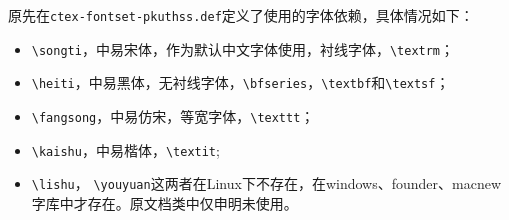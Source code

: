 原先\pkuthss{}在\verb|ctex-fontset-pkuthss.def|定义了使用的字体依赖，具体情况如下：
\begin{itemize}
  \item \verb|\songti|，中易宋体，作为默认中文字体使用，衬线字体，\verb|\textrm|；
  \item \verb|\heiti|，中易黑体，无衬线字体，\verb|\bfseries|，\verb|\textbf|和\verb|\textsf|；
  \item \verb|\fangsong|，中易仿宋，等宽字体，\verb|\texttt|；
  \item \verb|\kaishu|，中易楷体，\verb|\textit|;
  \item \verb|\lishu|， \verb|\youyuan|这两者在Linux下不存在，在windows、founder、macnew字库中才存在。原\pkuthss{}文档类中仅申明未使用。
\end{itemize}

\begin{table}[htbp]
  \centering
  \begin{minipage}[t]{\linewidth} %
    \caption{\CTeX{} 宏集自动配置字体策略}
    \label{tab:ctex-font-select}
\end{minipage}
\end{table}
